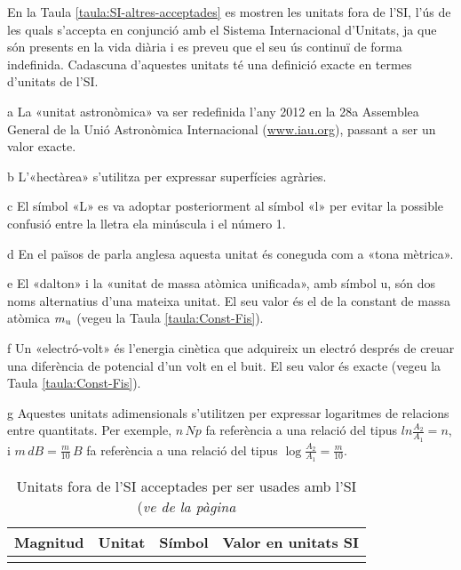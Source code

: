 En la Taula \vref{taula:SI-altres-acceptades} es mostren les unitats fora de l'SI, l'ús de les quals s'accepta en conjunció amb el Sistema Internacional d'Unitats, ja que són presents en la vida diària i es preveu que el seu ús continuï de forma indefinida. Cadascuna d'aquestes unitats té una definició exacte en termes d'unitats de l'SI.

\begin{ThreePartTable}
\begin{TableNotes}
    \item[a] {\footnotesize La «unitat astronòmica» va ser redefinida l'any 2012 en la 28a Assemblea General de la Unió Astronòmica Internacional (\href{http://www.iau.org/}{www.iau.org}), passant a ser un valor exacte.}
    \item[b] {\footnotesize L'«hectàrea» s'utilitza per expressar superfícies agràries.}
    \item[c] {\footnotesize El símbol «L» es va adoptar posteriorment al símbol «l» per evitar la possible confusió entre la lletra ela minúscula i  el número 1.}
    \item[d] {\footnotesize En el països de parla anglesa aquesta unitat és coneguda com a «tona mètrica».}
    \item[e] {\footnotesize El «dalton» i la «unitat de massa atòmica unificada», amb símbol u,  són dos noms alternatius d'una mateixa unitat. El seu valor és el de la constant de massa atòmica  $m_\mathrm{u}$ (vegeu la Taula \vref{taula:Const-Fis}).}
    \item[f] {\footnotesize Un «electró-volt» és l'energia cinètica que adquireix un electró després de creuar una diferència de potencial d'un volt en el buit. El seu valor és exacte (vegeu la Taula \vref{taula:Const-Fis}).}
    \item[g] {\footnotesize Aquestes unitats adimensionals s'utilitzen per expressar logaritmes de relacions entre quantitats. Per exemple, $n\si{\,Np}$ fa referència a una relació del tipus $ln\frac{A_2}{A_1}= n$, i  $ m\si{\,dB} =\frac{m}{10}\si{\,B}$  fa referència a una relació del tipus $\log\frac{A_2}{A_1} =\frac{m}{10}$.}
\end{TableNotes}
\begin{longtable}[h]{llcl}
   \caption{\label{taula:SI-altres-acceptades} Unitats fora de l'SI acceptades per a ser usades amb l'SI  }\\
   \toprule[1pt]
    Magnitud & Unitat &  Símbol & Valor en unitats SI\\
   \midrule
   \endfirsthead
   \caption[]{Unitats fora de l'SI acceptades per ser usades amb l'SI (\emph{ve de la pàgina
}}
\end{longtable}
\end{ThreePartTable}
